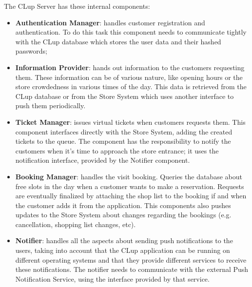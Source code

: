 The CLup Server has these internal components:
\begin{itemize}
    \item \textbf{Authentication Manager}: handles customer registration and authentication. To do this task this component needs to communicate tightly with the CLup database which stores the user data and their hashed passwords;
    \item \textbf{Information Provider}: hands out information to the customers requesting them. These information can be of various nature, like opening hours or the store crowdedness in various times of the day. This data is retrieved from the CLup database or from the Store System which uses another interface to push them periodically.
    \item \textbf{Ticket Manager}: issues virtual tickets when customers requests them. This component interfaces directly with the Store System, adding the created tickets to the queue. The component has the responsibility to notify the customers when it's time to approach the store entrance; it uses the notification interface, provided by the Notifier component.
    \item \textbf{Booking Manager}: handles the visit booking. Queries the database about free slots in the day when a customer wants to make a reservation. Requests are eventually finalized by attaching the shop list to the booking if and when the customer adds it from the application. This components also pushes updates to the Store System about changes regarding the bookings (e.g. cancellation, shopping list changes, etc).
    \item \textbf{Notifier}: handles all the aspects about sending push notifications to the users, taking into account that the CLup application can be running on different operating systems and that they provide different services to receive these notifications. The notifier needs to communicate with the external Push Notification Service, using the interface provided by that service.
\end{itemize}

